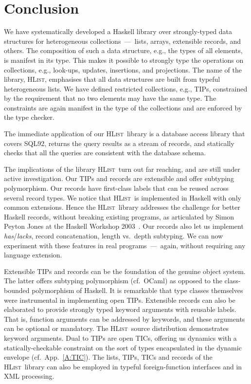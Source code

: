 \documentclass[nocopyrightspace,preprint]{sigplan-proc}
\newcommand{\hwVsTr}[2]{#2}
\newcommand{\HList}{\textsc{HList}}
\begin{document}


\section{Conclusion}
\label{S:concl}

We have systematically developed a Haskell library over strongly-typed
data structures for heterogeneous collections~---~lists, arrays,
extensible records, and others. The composition of such a data
structure, e.g., the types of all elements, is manifest in its
type. This makes it possible to strongly type the operations on
collections, e.g., look-ups, updates, insertions, and projections. The
name of the library, \HList, emphasises that all data structures are
built from typeful heterogeneous lists. We have defined restricted
collections, e.g., TIPs, constrained by the requirement that no two
elements may have the same type. The constraints are again manifest in
the type of the collections and are enforced by the type checker.

The immediate application of our \HList\ library is a database access
library that covers SQL92, returns the query results as a stream of
records, and statically checks that all the queries are consistent
with the database schema.

The implications of the library \HList\ turn out far reaching, and are
still under active investigation. Our TIPs and records are extensible
and offer subtyping polymorphism. Our records have first-class labels
that can be reused across several record types. We notice that \HList\
is implemented in Haskell with only common extensions. Hence the
\HList\ library addresses the challenge for better Haskell records,
without breaking existing programs, as articulated by Simon Peyton
Jones at the Haskell Workshop 2003~\cite{HW03}. Our records also let
us implement \emph{has}/\emph{lacks}, record concatenation, length
vs.\ depth subtyping. We can now experiment with these features in
real programs~---~again, without requiring any language extension.

Extensible TIPs and records can be the foundation of the genuine
object system. The latter offers subtyping polymorphism (cf.\ OCaml)
as opposed to the class-bounded polymorphism of Haskell. It is
remarkable that type classes themselves were instrumental in
implementing open TIPs. \hwVsTr{}{Extensible records can also be
elaborated to provide strongly typed keyword arguments with reusable
labels. That is, function arguments can be addressed by keywords, and
these arguments can be optional or mandatory. The \HList\ source
distribution demonstrates keyword arguments.} Dual to TIPs are open
TICs, offering us dynamics with a statically-checkable constraint on
the sort of types encapsulated in the dynamic envelope\hwVsTr{}{ (cf.\
App.~\ref{A:TIC})}. The lists, TIPs, TICs and records of the \HList\
library can also be employed in typeful foreign-function interfaces
and in XML processing.
\end{document}
